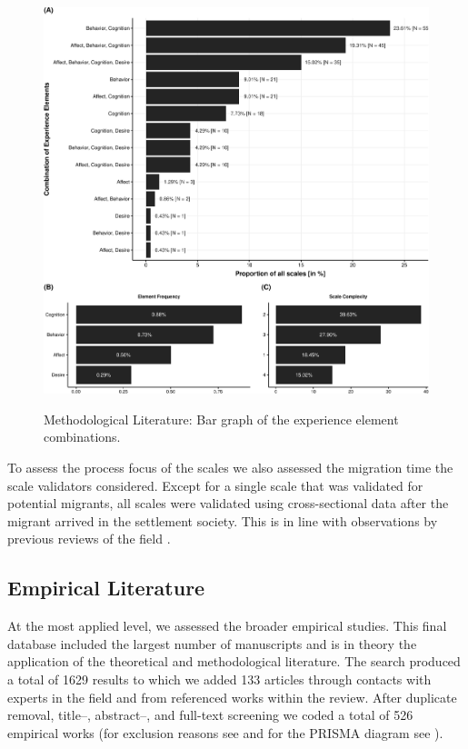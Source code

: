 \begin{figure}[h]
\centering
\caption{Methodological Literature: Bar graph of the experience element combinations.}
\includegraphics[width=\textwidth]{Figures/ABCDFreq-1}
\label{fig:ElementsScales}
\end{figure}

To assess the process focus of the scales we also assessed the migration
time the scale validators considered. Except for a single scale that was
validated for potential migrants, all scales were validated using
cross-sectional data after the migrant arrived in the settlement
society. This is in line with observations by previous reviews of the
field \citep[e.g.,][]{Brown2011}.

\subsection{Empirical Literature}

At the most applied level, we assessed the broader empirical studies.
This final database included the largest number of manuscripts and is in
theory the application of the theoretical and methodological literature.
The search produced a total of 1629 results to which we added 133
articles through contacts with experts in the field and from referenced
works within the review. After duplicate removal, title--, abstract--,
and full-text screening we coded a total of 526 empirical works (for
exclusion reasons see  and for the PRISMA
diagram see ).

